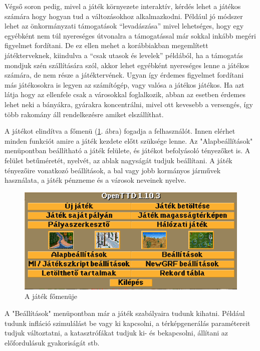 Végső soron pedig, mivel a játék környezete interaktív, kérdés lehet a játékos számára hogy hogyan tud a változásokhoz alkalmazkodni. Például jó módszer lehet az önkormányzati támogatások “levadászása” mivel lehetséges, hogy egy egyébként nem túl nyereséges útvonalra a támogatással már sokkal inkább megéri figyelmet fordítani. De ez ellen mehet a korábbiakban megemlített játékterveknek, kiindulva a “csak utasok és levelek” példából, ha a támogatás mondjuk szén szállítására szól, akkor lehet egyébként nyereséges lenne a játékos számára, de nem része a játéktervének. Ugyan így érdemes figyelmet fordítani más játékosokra is legyen az számítógép, vagy valósa a játékos játékos. Ha azt látja hogy az ellenfele csak a városokkal foglalkozik, abban az esetben érdemes lehet neki a bányákra, gyárakra koncentrálni, mivel ott kevesebb a versengés, így több rakomány áll rendelkezésre amiket elszállíthat.


A játékot elindítva a főmenü (\ref{fig:menu}. ábra) fogadja a felhasználót. Innen elérhet minden funkciót amire a játék kezdete előtt szüksége lenne. Az "Alapbeállítások" menüpontban beállítható a játék felülete, és játékot befolyásoló tényezőket is. A felület betűméretét, nyelvét, az ablak nagyságát tudjuk beállítani. A játék tényezőire vonatkozó beállítások, a bal vagy jobb kormányos járművek használata, a játék pénzneme és a városok neveinek nyelve.

\begin{figure}[h!]
	\centering
	\includegraphics[scale=0.8]{images/menu.png}
	\caption{A játék főmenüje}
	\label{fig:menu}
\end{figure}

A "Beállítások" menüpontban már a játék szabályaira tudunk kihatni. Például tudunk infláció szimulálást be vagy ki kapcsolni, a térképgenerálás paramétereit tudjuk változtatni, a katasztrófákat tudjuk ki- és bekapcsolni, állítani az előfordulásuk gyakoriságát stb.

